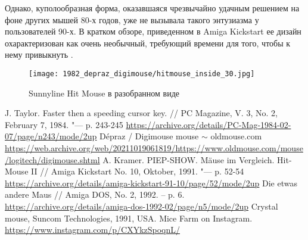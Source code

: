 \documentclass[11pt, a4paper]{article}
\begin{document}
Однако, куполообразная форма, оказавшаяся чрезвычайно удачным решением на фоне других мышей 80-х годов, уже не вызывала такого энтузиазма у пользователей 90-х. В кратком обзоре, приведенном в Amiga Kickstart ее дизайн охарактеризован как очень необычный, требующий времени для того, чтобы к нему привыкнуть \cite{sunnyline}.

 \begin{figure}[h]
    \centering
    \texttt{[image: 1982\_depraz\_digimouse/hitmouse\_inside\_30.jpg]}
    \caption{Sunnyline Hit Mouse в разобранном виде}
    \label{fig:HitMouseInside}
\end{figure}

\begin{thebibliography}{9}
 J. Taylor. Faster then a speeding cursor key. // PC Magazine, V. 3, No. 2, February 7, 1984. "--- p. 243-245 \url{https://archive.org/details/PC-Mag-1984-02-07/page/n243/mode/2up}
 Dépraz / Digimouse mouse $\sim$ oldmouse.com \url{https://web.archive.org/web/20211019061819/https://www.oldmouse.com/mouse/logitech/digimouse.shtml}
 A. Kramer. PIEP-SHOW. M\"ause im Vergleich. Hit-Mouse II // Amiga Kickstart No. 10, Oktober, 1991. "--- p. 52-54 \url{https://archive.org/details/amiga-kickstart-91-10/page/52/mode/2up}
 Die etwas andere Maus // Amiga DOS, No. 2, 1992. -- p. 6. \url {https://archive.org/details/amiga-dos-1992-02/page/n5/mode/2up}
 Crystal mouse, Suncom Technologies, 1991, USA. Mice Farm on Instagram. \url{https://www.instagram.com/p/CXYkzSpoqnL/}
\end{thebibliography}
\end{document}
